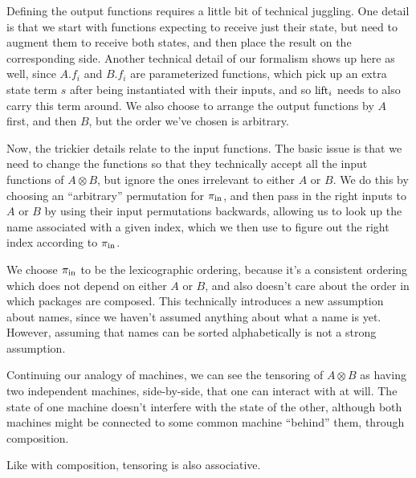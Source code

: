 Defining the output functions requires a little bit of technical juggling.
One detail is that we start with functions expecting to receive
just their state, but need to augment them to receive both states,
and then place the result on the corresponding side.
Another technical detail of our formalism shows up here as well,
since $A.f_i$ and $B.f_i$ are parameterized functions, which pick up
an extra state term $s$ after being instantiated with their inputs,
and so $\text{lift}_i$ needs to also carry this term around.
We also choose to arrange the output functions by $A$ first,
and then $B$, but the order we've chosen is arbitrary.

Now, the trickier details relate to the input functions.
The basic issue is that we need to change the functions so that
they technically accept all the input functions of $A \otimes B$,
but ignore the ones irrelevant to either $A$ or $B$.
We do this by choosing an ``arbitrary'' permutation for $\pi_{\text{in}}$,
and then pass in the right inputs to $A$ or $B$ by using
their input permutations backwards, allowing us to look up the name
associated with a given index,
which we then use to figure out the right index according to $\pi_{\text{in}}$.

We choose $\pi_{\text{in}}$ to be the lexicographic ordering,
because it's a consistent ordering which does not depend
on either $A$ or $B$, and also doesn't care about the order in which
packages are composed.
This technically introduces a new assumption about names, since we
haven't assumed anything about what a name is yet.
However, assuming that names can be sorted alphabetically is not
a strong assumption.

Continuing our analogy of machines, we can see the tensoring of $A \otimes B$
as having two independent machines, side-by-side, that one can interact
with at will.
The state of one machine doesn't interfere with the state of the other,
although both machines might be connected to some common machine ``behind''
them, through composition.

Like with composition, tensoring is also associative.

